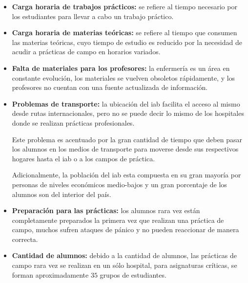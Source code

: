 \begin{itemize}
    \item \textbf{Carga horaria de trabajos prácticos:} se refiere al tiempo necesario
        por los estudiantes para llevar a cabo un trabajo práctico\cite{iab:tesis_alumnos}.
        
    \item \textbf{Carga horaria de materias teóricas:} se refiere al tiempo que consumen
        las materias teóricas, cuyo tiempo de estudio es reducido por la
        necesidad de acudir a prácticas de campo en horarios
        variados\cite{iab:tesis_alumnos}.
        
    \item \textbf{Falta de materiales para los profesores:} la enfermería es un
        área en constante evolución, los materiales se vuelven obsoletos rápidamente, y
        los profesores no cuentan con una fuente actualizada de
        información\cite{iab:tesis_alumnos}.
        
    \item \textbf{Problemas de transporte:} la ubicación del \Gls{iab} facilita el acceso al
        mismo desde rutas internacionales, pero no se puede decir lo mismo de
        los hospitales donde se realizan prácticas profesionales\cite{iab:tesis_alumnos}. 
        
        Este problema es acentuado por la gran cantidad de tiempo que deben pasar los alumnos
        en los medios de transporte para moverse desde sus respectivos hogares
        hasta el \Gls{iab} o a los campos de práctica\cite{iab:tesis_alumnos}.
        
        Adicionalmente, la población del \Gls{iab} esta compuesta en su gran mayoría por personas de
        niveles económicos medio-bajos y un gran porcentaje de los alumnos son del
        interior del país\cite{iab:tesis_alumnos}.
    
    \item \textbf{Preparación para las prácticas:} los alumnos rara vez están completamente preparados
        la primera vez que realizan una práctica de campo, muchos sufren ataques de pánico y
        no pueden reaccionar de manera correcta.
        
    \item \textbf{Cantidad de alumnos:} debido a la cantidad de alumnos, las 
        prácticas de campo rara vez se realizan en un sólo hospital, para asignaturas críticas, 
        se forman aproximadamente $35$ grupos de estudiantes.
\end{itemize}
